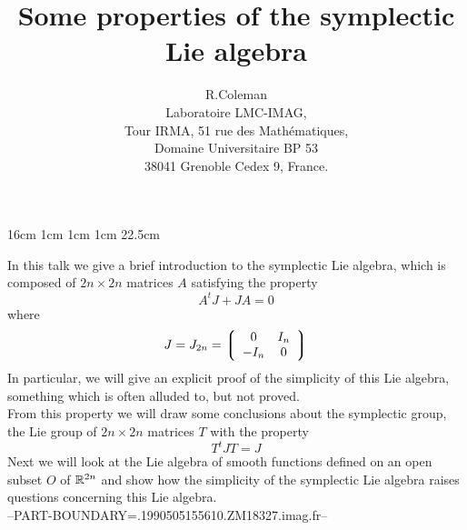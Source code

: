 \setlength{\textwidth } {16cm} 
\setlength{\oddsidemargin} {1cm} 
\setlength{\evensidemargin} {1cm} 
\setlength{\topmargin} {1cm} 
\setlength{\headheight}{0cm}
\setlength{\headsep}{0cm}
\setlength{\textheight} {22.5cm}
\setlength{\parindent}{10mm}
\title{Some properties of the symplectic Lie algebra}
\author{R.Coleman\\Laboratoire LMC-IMAG,\\Tour IRMA, 51 rue des Math\'ematiques,
\\Domaine Universitaire BP 53\\38041 Grenoble Cedex 9, France.}
\newcommand{\idV}{\operatorname{id_V}}
\newcommand{\icp}{\text i}
\newcommand{\gen}{\operatorname{gen}}
\newcommand{\eig}{\operatorname{eig}}

\maketitle

In this talk we give a brief introduction to the symplectic Lie algebra, 
which is composed of $2n\times 2n$ matrices $A$ satisfying the property
$$
A^tJ + JA = 0 
$$
where
$$
J = J_{2n} = \left\lgroup \begin{array}{cc}
		0 & I_n\\
		-I_n & 0
		\end{array} \right\rgroup
$$
In particular, we will give an explicit proof of the simplicity of this Lie algebra, 
something which is often alluded to, but not proved.\\
From this property we will draw some conclusions about the symplectic group, the 
Lie group of $2n\times 2n$ matrices $T$ with the property
$$
T^tJT = J
$$
Next we will look at the Lie algebra of smooth functions defined 
on an open subset $O$ of ${\Bbb R}^{2n}$ and show how the simplicity 
of the symplectic Lie algebra raises questions concerning this Lie algebra.\\







 
 







 





--PART-BOUNDARY=.1990505155610.ZM18327.imag.fr--


